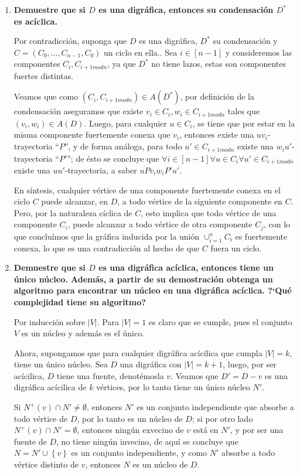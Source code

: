 \documentclass{article}
\newcommand{\set}[1]{\left\{ #1 \right\}}
\begin{document}
\begin{enumerate}
  \item \textbf{Demuestre que si $D$ es una digr\'afica, entonces su
    condensaci\'on $D^\ast$ es ac\'iclica.}

    Por contradicción, suponga que $D$ es una digráfica, $D^\ast$ su condensación y $C=(C_0,\dots,C_{n-1},C_0)$ un ciclo en ella.. Sea $i\in[n-1]$ y consideremos las componentes $C_i,C_{i+1 mod n}$, ya que $D^\ast$ no tiene lazos, estas son componentes fuertes distintas.

    Veamos que como $(C_i, C_{i+1 modn})\in A(D^\ast)$, por definición de la condensación aseguramos que existe $v_i\in C_i, w_i\in C_{i+1 modn}$ tales que $(v_i,w_i)\in A(D)$. Luego, para cualquier $u\in C_i$, se tiene que por estar en la misma componente fuertemente conexa que $v_i$, entonces existe una $uv_i$-trayectoria ``$P$'', y de forma análoga, para todo $u'\in C_{i+1 modn}$ existe una $w_iu'$-trayectoria ``$P'$''; de ésto se concluye que $\forall i\in[n-1]\forall u\in C_i \forall u'\in C_{i+1 modn}$ existe una $uu'$-trayectoria, a saber $uPv_iw_iP'u'$.

  En síntesis, cualquier vértice de una componente fuertemente conexa en el ciclo $C$ puede alcanzar, en $D$, a todo vértice de la siguiente componente en $C$. Pero, por la naturaleza cíclica de $C$, esto implica que todo vértice de una componente $C_i$, puede alcanzar a todo vértice de otra componente $C_j$, con lo que concluímos que la gráfica inducida por la unión $\cup_{i=1}^nC_i$ es fuertemente conexa, lo que es una contradicción al hecho de que $C$ fuera un ciclo.

  \item \textbf{Demuestre que si $D$ es una digr\'afica ac\'iclica, entonces
    tiene un \'unico n\'ucleo.   Adem\'as, a partir de su demostraci\'on
    obtenga un algoritmo para encontrar un n\'ucleo en una digr\'afica
    ac\'iclica.   ?`Qu\'e complejidad tiene su algoritmo?}

    Por inducción sobre $|V|$. Para $|V|=1$ es claro que se cumple, pues el conjunto $V$ es un núcleo y además es el único.

    Ahora, supongamos que para cualquier digráfica acícilica que cumpla $|V|=k$, tiene un único núcleo. Sea $D$ una digráfica con $|V|=k+1$, luego, por ser acícilica, $D$ tiene una fuente, denotémosla $v$. Veamos que $D'=D-v$ es una digráfica acícilica de $k$ vértices, por lo tanto tiene un único núcleo $N'$.

    Si $N^+(v)\cap N'\neq\emptyset$, entonces $N'$ es un conjunto independiente que absorbe a todo vértice de $D$, por lo tanto es un núcleo de $D$; si por otro lado $N^+(v)\cap N'=\emptyset$, entonces ningún exvecino de $v$ está en $N'$, y por ser una fuente de $D$, no tiene ningún invecino, de aquí se concluye que $N=N'\cup\set{v}$ es un conjunto independiente, y como $N'$ absorbe a todo vértice distinto de $v$, entonces $N$ es un núcleo de $D$.


\end{enumerate}
\end{document}
